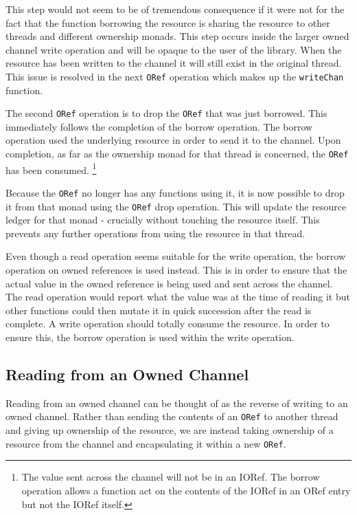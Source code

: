 \documentclass[onehalf,11pt]{beavtex}
\begin{document}
This step would not seem to be of tremendous consequence if it were not for the
fact that the function borrowing the resource is sharing the resource
to other threads and different ownership monads.
This step occurs inside the larger owned channel write operation and will
be opaque to the user of the library.
When the resource has been written to the channel it will still exist in the
original thread.
This issue is resolved in the next \texttt{ORef} operation which
makes up the \texttt{writeChan} function.

The second \texttt{ORef} operation is to drop the \texttt{ORef} that was just
borrowed. This immediately follows the completion of the borrow operation. The
borrow operation used the underlying resource in order to send it to the channel.
Upon completion, as far as the ownership monad for that thread is
concerned, the \texttt{ORef} has been consumed.
\footnote{The value sent across the channel will not be in an IORef.
  The borrow operation allows a function act on the contents of the IORef in
  an ORef entry but not the IORef itself.}

Because the \texttt{ORef} no longer has any functions using it, it is now
possible to drop it from that monad using the \texttt{ORef} drop operation.
This will update the resource ledger for that monad - crucially without
touching the resource itself.
This prevents any further operations from using the resource
in that thread.

Even though a read operation seems suitable for the write operation, the borrow
operation on owned references is used instead.
This is in order to ensure that the actual value in the owned reference is
being used and sent across the channel.
The read operation would report what the value was at the time of reading it but
other functions could then mutate it in quick succession after the read is
complete. %
A write operation should totally consume the resource.
In order to ensure this, the borrow operation is used within
the write operation.

\subsection{Reading from an Owned Channel}

Reading from an owned channel can be thought of as the reverse of writing to an
owned channel.
Rather than sending the contents of an \texttt{ORef} to another thread and giving 
up ownership of the resource,
we are instead taking ownership of a resource from the channel and encapsulating
it within a new \texttt{ORef}.
\end{document}
